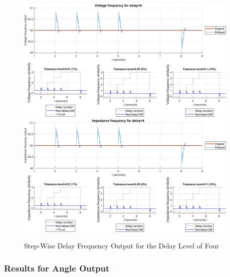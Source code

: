 \begin{figure}
    \caption{Step-Wise Delay Frequency Output for the Delay Level of Four}
    \includegraphics[width=0.95\textwidth]{PMUsim-figures/DelayOf_4/Step_vFrequency.png}    
    \label{fig:PMUsimStep_Four_vFrequency}
    \includegraphics[width=0.95\textwidth]{PMUsim-figures/DelayOf_4/Step_iFrequency.png}    
    \label{fig:PMUsimStep_Four_Frequency}
        \begin{small}
     \end{small}
\end{figure}


\newpage \subsubsection{Results for Angle Output}


